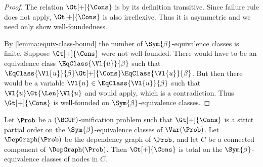 \begin{proof}
    The relation $\Gt[+]{\Cons}$ is by its definition transitive. Since failure
    rule  does not apply, $\Gt[+]{\Cons}$ is also
    irreflexive. Thus it is asymmetric and we need only show well-foundedness.

    By \cref{lemma:equiv-class-bound} the number of $\Sym{\beta}$-equivalence
    classes is finite. Suppose $\Gt[+]{\Cons}$ were not well-founded. There
    would have to be an equivalence class $\EqClass{\Vl{u}}{\beta}$ such that
    $\EqClass{\Vl{u}}{\beta} \Gt[+]{\Cons} \EqClass{\Vl{u}}{\beta}$. But then
    there would be a variable $\Vl{u} \in \EqClass{\Vl{u}}{\beta}$ such that
    $\Vl{u} \Gt{\Len} \Vl{u}$ and  would apply, which is
    a contradiction. Thus $\Gt[+]{\Cons}$ is well-founded on
    $\Sym{\beta}$-equivalence classes.
\end{proof}

\begin{Lemma}\label{lemma:total-connected-comp}
    Let $\Prob$ be a $(\BCUF)$-unification problem such that $\Gt[+]{\Cons}$ is
    a strict partial order on the $\Sym{\beta}$-equivalence classes of
    $\Var(\Prob)$. Let $\DepGraph(\Prob)$ be the dependency graph of $\Prob$,
    and let $C$ be a connected component of $\DepGraph(\Prob)$. Then
    $\Gt[+]{\Cons}$ is total on the $\Sym{\beta}$-equivalence classes of nodes
    in $C$.
\end{Lemma}

